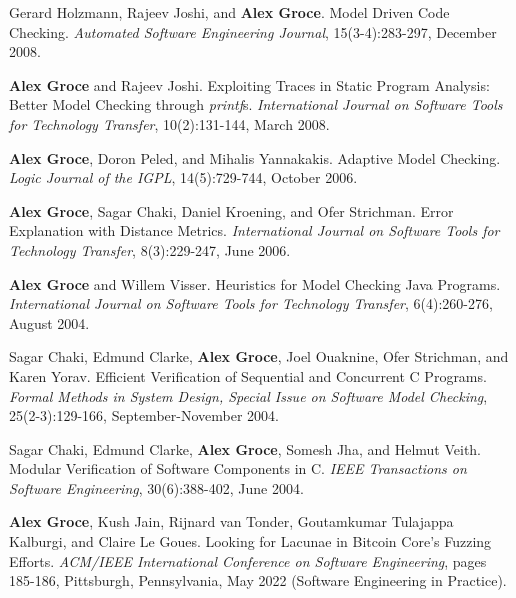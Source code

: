 \documentclass[ComputerScience]{vita}
\begin{document}
\begin{vita}
\begin{Refereed Journal Publications}
\item Gerard Holzmann, Rajeev Joshi, and {\bf Alex Groce}.
\newblock Model Driven Code Checking.
\newblock \emph{Automated Software Engineering Journal}, 15(3-4):283-297, December 2008.

\item
{\bf Alex Groce} and Rajeev Joshi.
\newblock Exploiting Traces in Static Program Analysis: Better Model Checking through \emph{printf}s.
\newblock \emph{International Journal on Software Tools for Technology Transfer}, 10(2):131-144, March 2008.

\item
{\bf Alex Groce}, Doron Peled, and Mihalis Yannakakis.
\newblock Adaptive Model Checking.
\newblock \emph{Logic Journal of the IGPL}, 14(5):729-744, October 2006.

\item
{\bf Alex Groce}, Sagar Chaki, Daniel Kroening, and Ofer Strichman.
\newblock Error Explanation with Distance Metrics.
\newblock \emph{International Journal on Software Tools for Technology Transfer}, 8(3):229-247, June 2006.

\item
{\bf Alex Groce} and Willem Visser.
\newblock Heuristics for Model Checking Java Programs.
\newblock \emph{International Journal on Software Tools for Technology Transfer}, 6(4):260-276, August 2004.


\item
Sagar Chaki, Edmund Clarke, {\bf Alex Groce}, Joel Ouaknine, Ofer Strichman, and Karen Yorav.
\newblock Efficient Verification of Sequential and Concurrent C Programs.
\newblock \emph{Formal Methods in System Design, Special Issue on Software Model Checking}, 25(2-3):129-166, September-November 2004.

\item
Sagar Chaki, Edmund Clarke, {\bf Alex Groce}, Somesh Jha, and Helmut Veith.
\newblock Modular Verification of Software Components in C.
\newblock \emph{IEEE Transactions on Software Engineering}, 30(6):388-402, June 2004.

\end{Refereed Journal Publications}

\begin{Refereed Conference and Workshop Publications}
  
\item {\bf Alex Groce}, Kush Jain, Rijnard van Tonder, Goutamkumar
    Tulajappa Kalburgi, and Claire Le Goues.
    \newblock Looking for Lacunae in Bitcoin Core’s Fuzzing Efforts.
    \newblock \emph{ACM/IEEE International Conference on Software
      Engineering}, pages 185-186, Pittsburgh,
    Pennsylvania, May 2022 (Software Engineering in Practice).
    

\end{Refereed Conference and Workshop Publications}
\end{vita}
\end{document}
